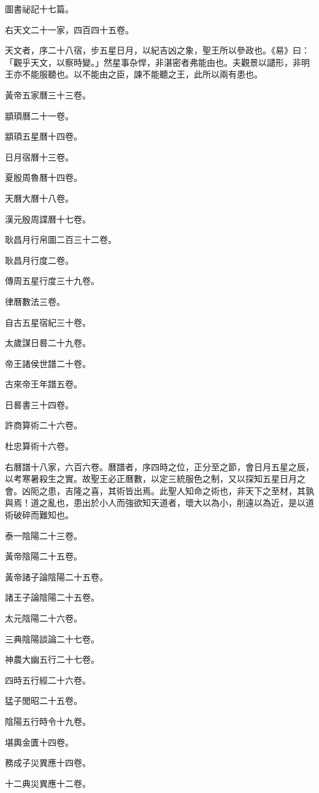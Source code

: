\begin{pinyinscope}
圖書祕記十七篇。

右天文二十一家，四百四十五卷。

天文者，序二十八宿，步五星日月，以紀吉凶之象，聖王所以參政也。《易》曰：「觀乎天文，以察時變。」然星事杂悍，非湛密者弗能由也。夫觀景以譴形，非明王亦不能服聽也。以不能由之臣，諫不能聽之王，此所以兩有患也。

黃帝五家曆三十三卷。

顓頊曆二十一卷。

顓頊五星曆十四卷。

日月宿曆十三卷。

夏殷周魯曆十四卷。

天曆大曆十八卷。

漢元殷周諜曆十七卷。

耿昌月行帛圖二百三十二卷。

耿昌月行度二卷。

傳周五星行度三十九卷。

律曆數法三卷。

自古五星宿紀三十卷。

太歲謀日晷二十九卷。

帝王諸侯世譜二十卷。

古來帝王年譜五卷。

日晷書三十四卷。

許商算術二十六卷。

杜忠算術十六卷。

右曆譜十八家，六百六卷。曆譜者，序四時之位，正分至之節，會日月五星之辰，以考寒暑殺生之實。故聖王必正曆數，以定三統服色之制，又以探知五星日月之會。凶阨之患，吉隆之喜，其術皆出焉。此聖人知命之術也，非天下之至材，其孰與焉！道之亂也，患出於小人而強欲知天道者，壞大以為小，削遠以為近，是以道術破碎而難知也。

泰一陰陽二十三卷。

黃帝陰陽二十五卷。

黃帝諸子論陰陽二十五卷。

諸王子論陰陽二十五卷。

太元陰陽二十六卷。

三典陰陽談論二十七卷。

神農大幽五行二十七卷。

四時五行經二十六卷。

猛子閭昭二十五卷。

陰陽五行時令十九卷。

堪輿金匱十四卷。

務成子災異應十四卷。

十二典災異應十二卷。


\end{pinyinscope}
